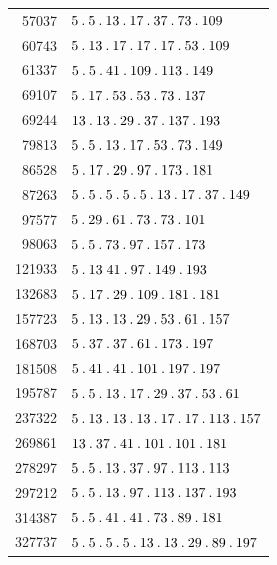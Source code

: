 \begin{longtable}{@{}r|l@{}}
57037 & $5\pdot 5\pdot 13\pdot 17\pdot 37\pdot 73\pdot 109$\\
60743 & $5\pdot 13\pdot 17\pdot 17\pdot 17\pdot 53\pdot 109$\\
61337 & $5\pdot 5\pdot 41\pdot 109\pdot 113\pdot 149$\\
69107 & $5\pdot 17\pdot 53\pdot 53\pdot 73\pdot 137$\\
69244 & $13\pdot 13\pdot 29\pdot 37\pdot 137\pdot 193$\\
79813 & $5\pdot 5\pdot 13\pdot 17\pdot 53\pdot 73\pdot 149$\\
86528 & $5\pdot 17\pdot 29\pdot 97\pdot 173\pdot 181$\\
87263 & $5\pdot 5\pdot 5\pdot 5\pdot 5\pdot 13\pdot 17\pdot 37\pdot 149$\\
97577 & $5\pdot 29\pdot 61\pdot 73\pdot 73\pdot 101$\\
98063 & $5\pdot 5\pdot 73\pdot 97\pdot 157\pdot 173$\\
121933 & $5\pdot 13\;41\pdot 97\pdot 149\pdot 193$\\
132683 & $5\pdot 17\pdot 29\pdot 109\pdot 181\pdot 181$\\
157723 & $5\pdot 13\pdot 13\pdot 29\pdot 53\pdot 61\pdot 157$\\
168703 & $5\pdot 37\pdot 37\pdot 61\pdot 173\pdot 197$\\
181508 & $5\pdot 41\pdot 41\pdot 101\pdot 197\pdot 197$\\
195787 & $5\pdot 5\pdot 13\pdot 17\pdot 29\pdot 37\pdot 53\pdot 61$\\
237322 & $5\pdot 13\pdot 13\pdot 13\pdot 17\pdot 17\pdot 113\pdot 157$\\
269861 & $13\pdot 37\pdot 41\pdot 101\pdot 101\pdot 181$\\
278297 & $5\pdot 5\pdot 13\pdot 37\pdot 97\pdot 113\pdot 113$\\
297212 & $5\pdot 5\pdot 13\pdot 97\pdot 113\pdot 137\pdot 193$\\
314387 & $5\pdot 5\pdot 41\pdot 41\pdot 73\pdot 89\pdot 181$\\
327737 & $5\pdot 5\pdot 5\pdot 5\pdot 13\pdot 13\pdot 29\pdot 89\pdot 197$\\
\end{longtable}\endgroup

